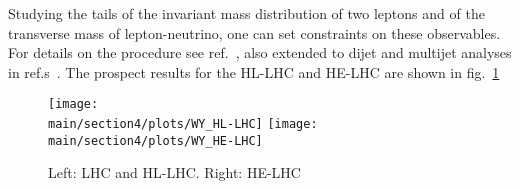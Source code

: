 Studying the tails of the invariant mass distribution of two leptons and of the transverse mass of lepton-neutrino, one can set constraints on these observables. For details on the procedure see ref.~\cite{Farina:2016rws}, also extended to dijet and multijet analyses in ref.s~\cite{Alioli:2017nzr,Alioli:2017jdo}. The prospect results for the HL-LHC and HE-LHC are shown in fig.~\ref{fig:DY-WY}
\begin{figure}[ht]
\centering
\texttt{[image: \\main/section4/plots/WY\_HL-LHC]}
\texttt{[image: \\main/section4/plots/WY\_HE-LHC]}
\caption{Left: LHC and HL-LHC. Right: HE-LHC}
\label{fig:DY-WY}
\end{figure}
